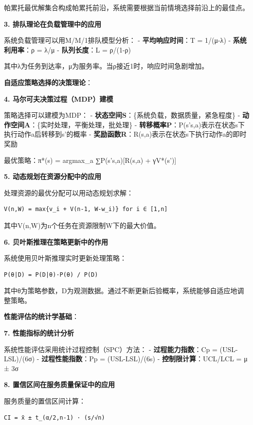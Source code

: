 帕累托最优解集合构成帕累托前沿，系统需要根据当前情境选择前沿上的最佳点。

\textbf{3. 排队理论在负载管理中的应用}

系统负载管理可以用M/M/1排队模型分析： - \textbf{平均响应时间}：T = 1/(μ-λ) - \textbf{系统利用率}：ρ = λ/μ - \textbf{队列长度}：L = ρ/(1-ρ)

其中λ为任务到达率，μ为服务率。当ρ接近1时，响应时间急剧增加。

\textbf{自适应策略选择的决策理论}：

\textbf{4. 马尔可夫决策过程（MDP）建模}

策略选择可以建模为MDP： - \textbf{状态空间S}：\{系统负载，数据质量，紧急程度\} - \textbf{动作空间A}：\{实时处理，平衡处理，批处理\} - \textbf{转移概率P}：P(s'\textbar s,a)表示在状态s下执行动作a后转移到s'的概率 - \textbf{奖励函数R}：R(s,a)表示在状态s下执行动作a的即时奖励

最优策略：π*(s) = argmax\_a ∑P(s'\textbar s,a){[}R(s,a) + γV*(s'){]}

\textbf{5. 动态规划在资源分配中的应用}

处理资源的最优分配可以用动态规划求解：

\begin{lstlisting}
V(n,W) = max{v_i + V(n-1, W-w_i)} for i ∈ [1,n]
\end{lstlisting}

其中V(n,W)为n个任务在资源限制W下的最大价值。

\textbf{6. 贝叶斯推理在策略更新中的作用}

系统使用贝叶斯推理实时更新处理策略：

\begin{lstlisting}
P(θ|D) = P(D|θ)·P(θ) / P(D)
\end{lstlisting}

其中θ为策略参数，D为观测数据。通过不断更新后验概率，系统能够自适应地调整策略。

\textbf{性能评估的统计学基础}：

\textbf{7. 性能指标的统计分析}

系统性能评估采用统计过程控制（SPC）方法： - \textbf{过程能力指数}：Cp = (USL-LSL)/(6σ) - \textbf{过程性能指数}：Pp = (USL-LSL)/(6s) - \textbf{控制限计算}：UCL/LCL = μ ± 3σ

\textbf{8. 置信区间在服务质量保证中的应用}

服务质量的置信区间计算：

\begin{lstlisting}
CI = x̄ ± t_(α/2,n-1) · (s/√n)
\end{lstlisting}

